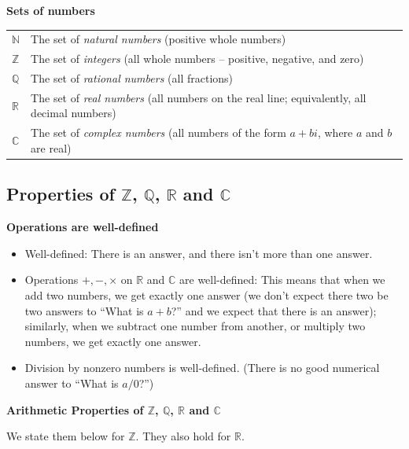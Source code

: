 \documentclass[11pt]{article}
\newcommand{\R}{\mathbb{R}}
\newcommand{\C}{\mathbb{C}}
\newcommand{\Q}{\mathbb{Q}}
\newcommand{\N}{\mathbb{N}}
\newcommand{\Z}{\mathbb{Z}}
\theoremstyle{definition}
\begin{document}
\vfill 

{\bf Sets of numbers}

\begin{tabular}{ll}
$\N$ & The set of {\em natural numbers} (positive whole numbers) \\
$\Z$ & The set of {\em integers} (all whole numbers -- positive, negative, and zero) \\
$\Q$ & The set of {\em rational numbers} (all fractions) \\
$\R$ & The set of {\em real numbers} (all numbers on the real line; equivalently, all decimal numbers) \\
$\C$ & The set of {\em complex numbers} (all numbers of the form $a+bi$, where $a$ and $b$ are real)
\end{tabular}


\newpage
\subsection{Properties of $\Z$, $\Q$, $\R$ and $\C$} \label{s: properties of R and Z}

{\bf Operations are well-defined}
\vspace*{-4pt}
\begin{itemize}
\item[] Well-defined: There is an answer, and there isn't more than one answer.

\item[] Operations $+, -, \times$ on $\R$ and $\C$ are well-defined: This means that when we add two numbers, we get exactly one answer (we don't expect there two be two answers to ``What is $a+b$?'' and we expect that there is an answer); similarly, when we subtract one number from another, or multiply two numbers, we get exactly one answer.

\item[] Division by nonzero numbers is well-defined. (There is no good numerical answer to ``What is $a/0$?'')
\end{itemize}

{\bf Arithmetic Properties of $\Z$, $\Q$, $\R$ and $\C$}

We state them below for $\Z$. They also hold for $\R$.
\end{document}
